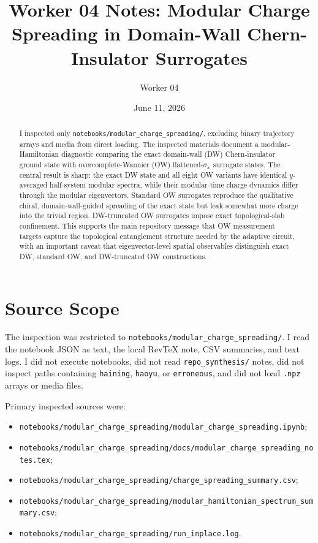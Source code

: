 \documentclass[aps,prb,onecolumn,nofootinbib,superscriptaddress]{revtex4-2}
\begin{document}
\title{Worker 04 Notes: Modular Charge Spreading in Domain-Wall Chern-Insulator Surrogates}
\author{Worker 04}
\date{June 11, 2026}

\begin{abstract}
I inspected only \texttt{notebooks/modular\_charge\_spreading/}, excluding binary trajectory arrays and media from direct loading.  The inspected materials document a modular-Hamiltonian diagnostic comparing the exact domain-wall (DW) Chern-insulator ground state with overcomplete-Wannier (OW) flattened-\(\sigma_x\) surrogate states.  The central result is sharp: the exact DW state and all eight OW variants have identical \(y\)-averaged half-system modular spectra, while their modular-time charge dynamics differ through the modular eigenvectors.  Standard OW surrogates reproduce the qualitative chiral, domain-wall-guided spreading of the exact state but leak somewhat more charge into the trivial region.  DW-truncated OW surrogates impose exact topological-slab confinement.  This supports the main repository message that OW measurement targets capture the topological entanglement structure needed by the adaptive circuit, with an important caveat that eigenvector-level spatial observables distinguish exact DW, standard OW, and DW-truncated OW constructions.
\end{abstract}

\maketitle
\tableofcontents

\section{Source Scope}

The inspection was restricted to \texttt{notebooks/modular\_charge\_spreading/}.  I read the notebook JSON as text, the local RevTeX note, CSV summaries, and text logs.  I did not execute notebooks, did not read \texttt{repo\_synthesis/} notes, did not inspect paths containing \texttt{haining}, \texttt{haoyu}, or \texttt{erroneous}, and did not load \texttt{.npz} arrays or media files.

Primary inspected sources were:
\begin{itemize}
\item \texttt{notebooks/modular\_charge\_spreading/modular\_charge\_spreading.ipynb};
\item \texttt{notebooks/modular\_charge\_spreading/docs/modular\_charge\_spreading\_notes.tex};
\item \texttt{notebooks/modular\_charge\_spreading/charge\_spreading\_summary.csv};
\item \texttt{notebooks/modular\_charge\_spreading/modular\_hamiltonian\_spectrum\_summary.csv};
\item \texttt{notebooks/modular\_charge\_spreading/run\_inplace.log}.
\end{itemize}
\end{document}
